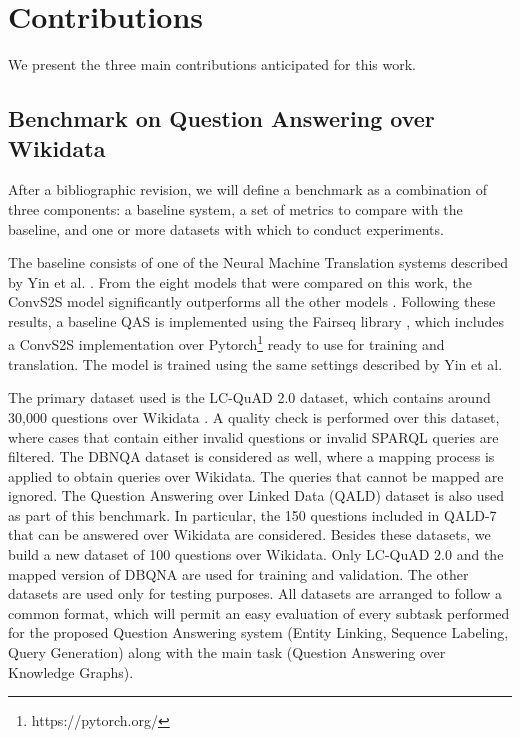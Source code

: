 \section*{Contributions}
We present the three main contributions anticipated for this work.
\subsection*{Benchmark on Question Answering over Wikidata}
After a bibliographic revision, we will define a benchmark as a combination of three 
components: a baseline system, a set of metrics to compare with the baseline, and one or 
more datasets with which to conduct experiments.

The baseline consists of one of the Neural Machine Translation systems described by 
Yin et al. \cite{nmt:nl-to-sparql-Yin19}. From the eight models that were compared on this work, 
the ConvS2S model \cite{nmt:convS2S-GehringAGYD17} 
significantly outperforms all the other models . Following these results, a baseline QAS is 
implemented using the Fairseq library \cite{nmt:fairseq-OttEBFGNGA19}, which includes a ConvS2S implementation over 
Pytorch\footnote{https://pytorch.org/} ready to use for training and translation. The model is trained using the same 
settings described by Yin et al.

The primary dataset used is the LC-QuAD 2.0 dataset, which contains around 30,000 
questions over Wikidata \cite{dataset:lcquad2-DubeyBA019}. A quality check is performed over this dataset, where cases 
that contain either invalid questions or invalid SPARQL queries are filtered. The DBNQA 
dataset \cite{dataset:dbnqa-hartmann-marx-soru-2018} is considered as well, where a mapping process is applied to obtain queries over 
Wikidata. The queries that cannot be mapped are ignored. The Question Answering over 
Linked Data (QALD) \cite{qa:qald-Lopezetal2013} dataset is also used as part of this benchmark. In particular, the 
150 questions included in QALD-7 \cite{dataset:qald7-UsbeckNHKRN17} that can be answered over Wikidata are considered. 
Besides these datasets, we build a new dataset of 100 questions over Wikidata. Only LC-QuAD 2.0 
and the mapped version of DBQNA are used for training and validation. The other 
datasets are used only for testing purposes. All datasets are arranged to follow a common 
format, which will permit an easy evaluation of every subtask performed for the proposed 
Question Answering system (Entity Linking, Sequence Labeling, Query Generation) along 
with the main task (Question Answering over Knowledge Graphs).


